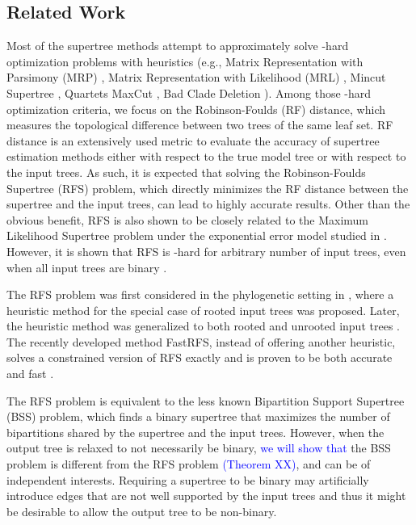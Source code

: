 \documentclass[twocolumn]{bmcart}%
\theoremstyle{mystyle}
\theoremstyle{proofstyle}
\begin{document}
\subsection{Related Work}
Most of the supertree methods attempt to approximately solve \NP-hard optimization problems with heuristics (e.g., Matrix Representation with Parsimony (MRP) \cite{MRP}\cite{MRPRagan}, Matrix Representation with Likelihood (MRL) \cite{MRL}, Mincut Supertree \cite{MinCut}, Quartets MaxCut \cite{QMaxCut}, Bad Clade Deletion \cite{BCD}). Among those \NP-hard optimization criteria, we focus on the  Robinson-Foulds (RF) distance, which measures the topological difference between two trees of the same leaf set. RF distance is an extensively used metric to evaluate the accuracy of supertree estimation methods either with respect to the true model tree or with respect to the input trees. As such, it is expected that solving the Robinson-Foulds Supertree (RFS) problem, which directly minimizes the RF distance between the supertree and the input trees, can lead to highly accurate results. Other than the obvious benefit, RFS is also shown to be closely related to the Maximum Likelihood Supertree problem under the exponential error model studied in \cite{MLS}.
However, it is shown that RFS is \NP-hard for arbitrary number of input trees, even when all input trees are binary \cite{RFScomplexity}.

The RFS problem was first considered in the phylogenetic setting in \cite{RFS}, where a heuristic method for the special case of rooted input trees was proposed. Later, the heuristic method was generalized to both rooted and unrooted input trees \cite{RFSunrooted}. 
The recently developed method FastRFS, instead of offering another heuristic, solves a constrained version of RFS exactly and is proven to be both accurate and fast \cite{FastRFS}. 

The RFS problem is equivalent to the less known Bipartition Support Supertree (BSS) problem, which finds a binary supertree that maximizes the number of bipartitions shared by the supertree and the input trees. 
However, when the output tree is relaxed to not necessarily be binary, 
\textcolor{blue}{we will show that }
the BSS problem is different from the RFS problem
\textcolor{blue}{(Theorem XX)}, 
and can be of independent interests. 
Requiring a supertree to be binary may artificially introduce edges that are not well supported by the input trees and thus it might be desirable to allow the output tree to be non-binary. 
\end{document}
